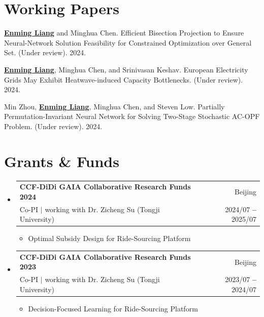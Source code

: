 \documentclass[letterpaper,11pt]{article}
\makeatletter
\newcommand{\resumeItem}[1]{
  \item\small{
    {#1 \vspace{-2pt}}
  }
}
\newcommand{\resumeSubheading}[4]{
  \vspace{-2pt}\item
    \begin{tabular*}{0.97\textwidth}[t]{l@{\extracolsep{\fill}}r}
      \textbf{#1} & #2 \\
      {\small#3} & {\small #4} \\
    \end{tabular*}\vspace{-7pt}
}
\newcommand{\resumeSubHeadingListStart}{\begin{itemize}[leftmargin=0.15in, label={}]}
\newcommand{\resumeSubHeadingListEnd}{\end{itemize}}
\newcommand{\resumeItemListStart}{\begin{itemize}}
\newcommand{\resumeItemListEnd}{\end{itemize}\vspace{-5pt}}
\makeatother
\begin{document}
\section{\LARGE Working Papers}
\vspace{5pt}
\resumeSubHeadingListStart
  \small{\item{
    {\underline{\textbf{Enming Liang}} and Minghua Chen. Efficient Bisection Projection to Ensure Neural-Network Solution Feasibility for Constrained Optimization over General Set. (Under review). 2024.}\\ \vspace{5pt}
  }}
  \small{\item{
    {\underline{\textbf{Enming Liang}}, Minghua Chen, and Srinivasan Keshav. European Electricity Grids May Exhibit Heatwave-induced Capacity Bottlenecks. (Under review). 2024.}\\ \vspace{5pt}
  }}
  \small{\item{
    Min Zhou, {\underline{\textbf{Enming Liang}}, Minghua Chen, and Steven Low. Partially Permutation-Invariant Neural Network for Solving Two-Stage Stochastic AC-OPF Problem. (Under review). 2024.}\\ \vspace{5pt}
  }}
  \vspace{5pt}
\resumeSubHeadingListEnd






\section{\LARGE Grants \& Funds}
\vspace{5pt}
\resumeSubHeadingListStart

\resumeSubheading
{CCF-DiDi GAIA Collaborative Research Funds 2024}{Beijing}
{Co-PI $|$ working with Dr. Zicheng Su (Tongji University)}{2024/07 \textbf{--} 2025/07}
  \resumeItemListStart
      \resumeItem{Optimal Subsidy Design for Ride-Sourcing Platform}
\resumeItemListEnd
\vspace{5pt}

\resumeSubheading
{CCF-DiDi GAIA Collaborative Research Funds 2023}{Beijing}
{Co-PI $|$ working with Dr. Zicheng Su (Tongji University)}{2023/07 \textbf{--} 2024/07}
  \resumeItemListStart
      \resumeItem{Decision-Focused Learning for Ride-Sourcing Platform}
\resumeItemListEnd
\vspace{5pt}
\resumeSubHeadingListEnd
\end{document}
